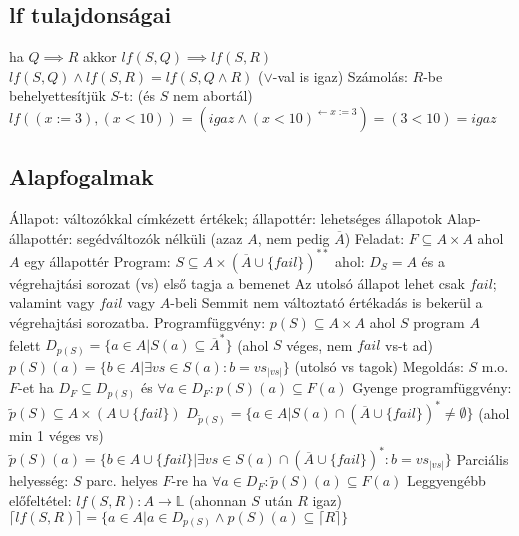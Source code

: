 \documentclass[12pt,a4paper]{article}
\begin{document}
\subsection{lf tulajdonságai}

\begin{outline}
	\1 ha $Q \implies R$ akkor $lf(S,Q) \implies lf(S,R)$
	\1 $lf(S,Q) \wedge lf(S,R) = lf(S,Q \wedge R)$ ($\lor$-val is igaz)
	\1 Számolás: $R$-be behelyettesítjük $S$-t: (és $S$ nem abortál)\\
	$lf((x:=3),(x<10))=(igaz \wedge (x<10)^{\leftarrow x := 3})=(3 < 10)=igaz$
\end{outline}

\pagebreak

\subsection{Alapfogalmak}

\begin{outline}
	\1 Állapot: változókkal címkézett értékek; állapottér: lehetséges állapotok
		\2 Alap-állapottér: segédváltozók nélküli (azaz $A$, nem pedig $\overline{A}$)
	\1 Feladat: $F \subseteq A \times A$ ahol $A$ egy állapottér
	\1 Program: $S \subseteq A \times (\overline{A} \cup \{fail\})^{**}$ ahol:
		\2 $D_S=A$ és a végrehajtási sorozat (vs) első tagja a bemenet
		\2 Az utolsó állapot lehet csak $fail$; valamint vagy $fail$ vagy $A$-beli
		\2 Semmit nem változtató értékadás is bekerül a végrehajtási sorozatba.
	\1 Programfüggvény: $p(S) \subseteq A \times A$ ahol $S$ program $A$ felett
		\2 $D_{p(S)}=\{a \in A|S(a) \subseteq \overline{A}^* \}$ (ahol $S$ véges, nem $fail$ vs-t ad)
		\2 $p(S)(a) = \{b \in A | \exists vs \in S(a): b=vs_{|vs|}\}$ (utolsó vs tagok)
	\1 Megoldás: $S$ m.o. $F$-et ha $D_F \subseteq D_{p(S)}$ és $\forall a \in D_F : p(S)(a) \subseteq F(a)$
	\1 Gyenge programfüggvény: $\tilde{p}(S) \subseteq A \times (A \cup \{fail\})$
		\2 $D_{\tilde{p}(S)}= \{ a \in A | S(a) \cap (\overline{A} \cup \{fail\})^* \ne \emptyset \}$ \;\; (ahol min 1 véges vs)
		\2 $\widetilde{p}(S)(a) = \{b \in A \cup \{fail\} | \exists vs \in S(a) \cap (\overline{A} \cup \{fail\})^*: b=vs_{|vs|}\}$
	\1 Parciális helyesség: $S$ parc. helyes $F$-re ha $\forall a \in D_F: \widetilde{p}(S)(a) \subseteq F(a)$
	\1 Leggyengébb előfeltétel: $lf(S,R) : A \to \mathbb{L}$ \;\; (ahonnan $S$ után $R$ igaz)
		\2 $\lceil lf(S,R) \rceil = \{a \in A | a \in D_{p(S)} \wedge p(S)(a) \subseteq \lceil R \rceil \}$
\end{outline}
\end{document}
